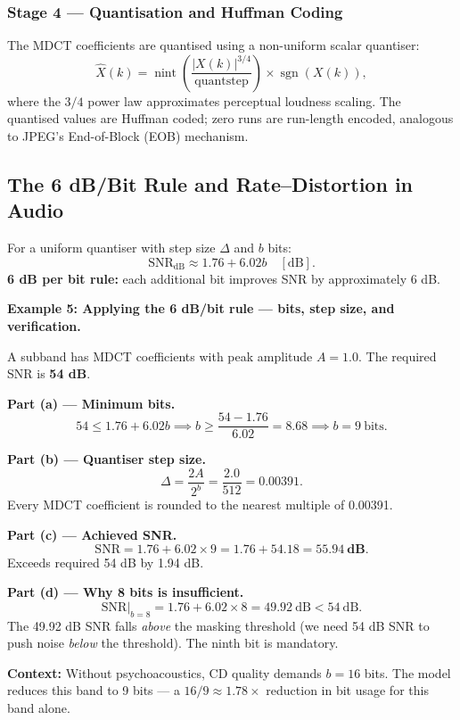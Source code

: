 \subsubsection{Stage 4 --- Quantisation and Huffman Coding}

The MDCT coefficients are quantised using a non-uniform scalar quantiser:
\begin{equation}
\hat{X}(k) = \operatorname{nint}\!\left( \frac{|X(k)|^{3/4}}{\text{quantstep}} \right) \times \operatorname{sgn}(X(k)),
\label{eq:mp3quant}
\end{equation}
where the $3/4$ power law approximates perceptual loudness scaling. The quantised values are Huffman coded; zero runs are run-length encoded, analogous to JPEG's End-of-Block (EOB) mechanism.

\subsection{The 6 dB/Bit Rule and Rate--Distortion in Audio}

For a uniform quantiser with step size $\Delta$ and $b$ bits:
\begin{equation}
\mathrm{SNR_{dB}} \approx 1.76 + 6.02b \quad [\text{dB}].
\label{eq:snrbit}
\end{equation}
\textbf{6 dB per bit rule:} each additional bit improves SNR by approximately 6 dB.

\begin{examplebox}
\textbf{Example 5: Applying the 6 dB/bit rule --- bits, step size, and verification.}

\medskip
A subband has MDCT coefficients with peak amplitude $A = 1.0$. The required SNR is \textbf{54 dB}.

\medskip
\noindent\textbf{Part (a) --- Minimum bits.}
\[
54 \leq 1.76 + 6.02b \implies b \geq \frac{54 - 1.76}{6.02} = 8.68 \implies \boxed{b = 9\ \text{bits}}.
\]

\medskip
\noindent\textbf{Part (b) --- Quantiser step size.}
\[
\Delta = \frac{2A}{2^b} = \frac{2.0}{512} = \mathbf{0.00391}.
\]
Every MDCT coefficient is rounded to the nearest multiple of 0.00391.

\medskip
\noindent\textbf{Part (c) --- Achieved SNR.}
\[
\mathrm{SNR} = 1.76 + 6.02\times9 = 1.76 + 54.18 = \mathbf{55.94\ \text{dB}}.
\]
Exceeds required 54 dB by 1.94 dB. \checkmark

\medskip
\noindent\textbf{Part (d) --- Why 8 bits is insufficient.}
\[
\mathrm{SNR}|_{b=8} = 1.76 + 6.02\times8 = 49.92\ \text{dB} < 54\ \text{dB}.
\]
The 49.92 dB SNR falls \emph{above} the masking threshold (we need 54 dB SNR to push noise \emph{below} the threshold). The ninth bit is mandatory.

\medskip
\noindent\textbf{Context:} Without psychoacoustics, CD quality demands $b = 16$ bits. The model reduces this band to 9 bits --- a $16/9 \approx 1.78\times$ reduction in bit usage for this band alone.
\end{examplebox}

